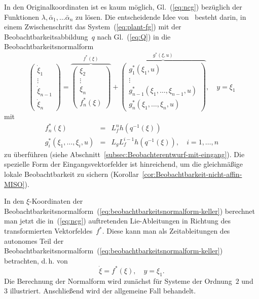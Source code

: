 In den Originalkoordinaten ist es kaum möglich, Gl.~(\ref{eq:ncg})
bezüglich der Funktionen $\lambda,\bar{\alpha}_{1},\ldots\bar{\alpha}_{n}$
zu lösen. Die entscheidende Idee von~\cite{keller86,keller86diss,keller87,phelps1988,phelps1991}
besteht darin, in einem Zwischenschritt das System~(\ref{eq:plant-fg})
mit der Beobachtbarkeitsabbildung~$q$ nach Gl.~(\ref{eq:Q}) in
die Beobachtbarkeitsnormalform
\begin{equation}
\left(\begin{array}{c}
\dot{\xi}_{1}\\
\vdots\\
\dot{\xi}_{n-1}\\
\dot{\xi}_{n}
\end{array}\right)=\overbrace{\left(\begin{array}{c}
\xi_{2}\\
\vdots\\
\xi_{n}\\
f_{n}^{*}(\xi)
\end{array}\right)}^{{\displaystyle f^{*}(\xi)}}+\overbrace{\left(\begin{array}{c}
g_{1}^{*}(\xi_{1},u)\\
\vdots\\
g_{n-1}^{*}(\xi_{1},\ldots,\xi_{n-1},u)\\
g_{n}^{*}(\xi_{1},\ldots,\xi_{n},u)
\end{array}\right)}^{{\displaystyle g^{*}(\xi,u)}},\quad y=\xi_{1}\label{eq:beobachtbarkeitsnormalform-keller}
\end{equation}
mit
\[
\begin{array}{lcl}
f_{n}^{*}(\xi) & = & L_{f}^{n}h(q^{-1}(\xi))\\
g_{i}^{*}(\xi_{1},\ldots,\xi_{i},u) & = & L_{g}L_{f}^{i-1}h(q^{-1}(\xi)),\quad i=1,\ldots,n
\end{array}
\]
zu überführen (siehe Abschnitt~\ref{subsec:Beobachterentwurf-mit-eingang}).
Die spezielle Form der Eingangsvektorfelder ist hinreichend, um die
gleichmäßige lokale Beobachtbarkeit zu sichern (Korollar~\ref{cor:Beobachtbarkeit-nicht-affin-MISO}). 

In den $\xi$-Koordinaten der Beobachtbarkeitsnormalform~(\ref{eq:beobachtbarkeitsnormalform-keller})
berechnet man jetzt die in~(\ref{eq:ncg}) auftretenden Lie-Ableitungen
in Richtung des transformierten Vektorfeldes~$f^{*}$. Diese kann
man als Zeitableitungen des autonomes Teil der Beobachtbarkeitsnormalform~(\ref{eq:beobachtbarkeitsnormalform-keller})
betrachten, d.\,h. von 
\begin{equation}
\dot{\xi}=f^{*}(\xi),\quad y=\xi_{1}.\label{eq:beobachtbarkeitsnormalform-keller-autonom}
\end{equation}
Die Berechnung der Normalform wird zunächst für Systeme der Ordnung~$2$
und~$3$ illustriert. Anschließend wird der allgemeine Fall behandelt.


